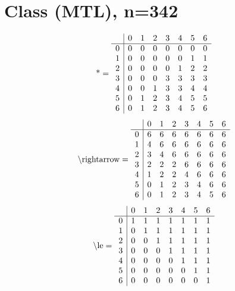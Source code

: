 \documentclass[11pt]{article}
\begin{document}
\section{Class (MTL), n=342}
\[\text{*} = 
\begin{array}{r | r r r r r r r}
 & 0 & 1 & 2 & 3 & 4 & 5 & 6 \\ \hline
0 & 0 & 0 & 0 & 0 & 0 & 0 & 0 \\
1 & 0 & 0 & 0 & 0 & 0 & 1 & 1 \\
2 & 0 & 0 & 0 & 0 & 1 & 2 & 2 \\
3 & 0 & 0 & 0 & 3 & 3 & 3 & 3 \\
4 & 0 & 0 & 1 & 3 & 3 & 4 & 4 \\
5 & 0 & 1 & 2 & 3 & 4 & 5 & 5 \\
6 & 0 & 1 & 2 & 3 & 4 & 5 & 6 \\
\end{array}
\]
\[\text{\textbackslash rightarrow} = 
\begin{array}{r | r r r r r r r}
 & 0 & 1 & 2 & 3 & 4 & 5 & 6 \\ \hline
0 & 6 & 6 & 6 & 6 & 6 & 6 & 6 \\
1 & 4 & 6 & 6 & 6 & 6 & 6 & 6 \\
2 & 3 & 4 & 6 & 6 & 6 & 6 & 6 \\
3 & 2 & 2 & 2 & 6 & 6 & 6 & 6 \\
4 & 1 & 2 & 2 & 4 & 6 & 6 & 6 \\
5 & 0 & 1 & 2 & 3 & 4 & 6 & 6 \\
6 & 0 & 1 & 2 & 3 & 4 & 5 & 6 \\
\end{array}
\]
\[\text{\textbackslash le} = 
\begin{array}{r | r r r r r r r}
 & 0 & 1 & 2 & 3 & 4 & 5 & 6 \\ \hline
0 & 1 & 1 & 1 & 1 & 1 & 1 & 1 \\
1 & 0 & 1 & 1 & 1 & 1 & 1 & 1 \\
2 & 0 & 0 & 1 & 1 & 1 & 1 & 1 \\
3 & 0 & 0 & 0 & 1 & 1 & 1 & 1 \\
4 & 0 & 0 & 0 & 0 & 1 & 1 & 1 \\
5 & 0 & 0 & 0 & 0 & 0 & 1 & 1 \\
6 & 0 & 0 & 0 & 0 & 0 & 0 & 1 \\
\end{array}
\]
\end{document}
